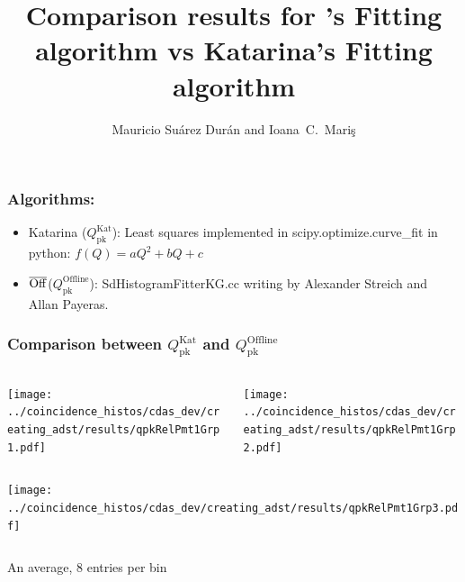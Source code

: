 \documentclass[aspectratio=169]{beamer}
\title{Comparison results for \Offline's Fitting algorithm vs
Katarina's Fitting algorithm}
\author{
  Mauricio Su\'arez Dur\'an and Ioana~C.~Mari\c{s}
}
\institute{IIHE-ULB}
\def\Offline{\mbox{$\overline{\rm Off}$\hspace{.05em}\raisebox{.4ex}{$\underline{\rm line}$}}\xspace}
\begin{document}
\begin{frame}
  \titlepage
\end{frame}

\begin{frame}
  \frametitle{Algorithms:}
  \begin{itemize} 
    \item Katarina ($Q^{\mathrm{Kat}}_{\mathrm{pk}}$): Least
      squares implemented in scipy.optimize.curve\_fit in python:
      $f(Q) = aQ^2+bQ+c$
      \vspace{0.5cm}
    \item \Offline ($Q^{\mathrm{Offline}}_{\mathrm{pk}}$):
      SdHistogramFitterKG.cc writing by Alexander
      Streich and Allan Payeras.
  \end{itemize}
\end{frame}

\begin{frame}
  \frametitle{Comparison between $Q^{\mathrm{Kat}}_{\mathrm{pk}}$
  and $Q^{\mathrm{Offline}}_{\mathrm{pk}}$}
  \vspace{0.1cm}
  \begin{columns}
    \centering
    \begin{column}{0.5\textwidth}
      \texttt{[image: ../coincidence\_histos/cdas\_dev/creating\_adst/results/qpkRelPmt1Grp1.pdf]}
    \end{column}
    \begin{column}{0.5\textwidth}
      \texttt{[image: ../coincidence\_histos/cdas\_dev/creating\_adst/results/qpkRelPmt1Grp2.pdf]}
    \end{column}
  \end{columns}

  \begin{columns}
    \centering
    \begin{column}{0.5\textwidth}
      \texttt{[image: ../coincidence\_histos/cdas\_dev/creating\_adst/results/qpkRelPmt1Grp3.pdf]}
    \end{column}
  \end{columns}
  An average, 8 entries per bin
\end{frame}
\end{document}
